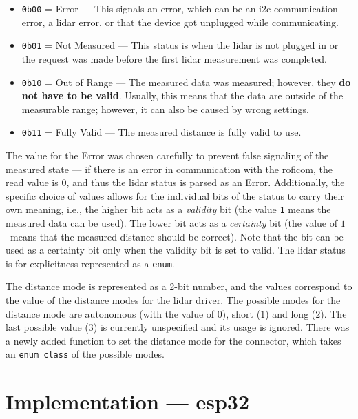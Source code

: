 \documentclass[
  digital,     %
  oneside,     %
  nosansbold,  %
  nocolorbold, %
  nolof,         %
  nolot,         %
]{fithesis4}
\newcommand{\TODO}[1]{#1} %
\newcommand{\TODOLIST}[1]{}
\begin{document}
\begin{itemize}
    \item \lstinline|0b00| = Error --- This signals an error, which can be an \acrshort{i2c}
        communication error, a \acrshort{lidar} error, or that the device got unplugged while
        communicating.  
    \item \lstinline|0b01| = Not Measured --- This status is when the \acrshort{lidar} is not
        plugged in or the request was made before the first \acrshort{lidar} measurement was
        completed.
    \item \lstinline|0b10| = Out of Range --- The measured data was measured; however, they
        \textbf{do not have to be valid}. Usually, this means that the data are outside of the
        measurable range; however, it can also be caused by wrong settings.
    \item \lstinline|0b11| = Fully Valid --- The measured distance is fully valid to use.
\end{itemize}

The value for the Error was chosen carefully to prevent false signaling of the measured state --- if
there is an error in communication with the \acrshort{roficom}, the read value is $0$, and thus the
\acrshort{lidar} status is parsed as an Error. Additionally, the specific choice of values allows
for the individual bits of the status to carry their own meaning, i.e., the higher bit acts as a
\emph{validity} bit (the value \verb|1| means the measured data can be used). The lower bit acts as
a \emph{certainty} bit (the value of $1$~means that the measured distance should be correct). Note
that the bit can be used as a certainty bit only when the validity bit is set to valid. The
\acrshort{lidar} status is for explicitness represented as a \lstinline|enum|.

The distance mode is represented as a 2-bit number, and the values correspond to the value of the
distance modes for the \acrshort{lidar} driver. The possible modes for the distance mode are
autonomous (with the value of $0$), short ($1$) and long ($2$). The last possible value ($3$) is
currently unspecified and its usage is ignored. There was a newly added function to set the distance
mode for the connector, which takes an \lstinline|enum class| of the possible modes.

\section{ Implementation --- esp32 }
\TODOLIST{
\begin{itemize}
    \item Apply changes from interface --- lidar status, distance and distance modes
    \item Issue $\rightarrow$ status is not being updated $\rightarrow$ Needed to implement poller
\end{itemize}
}
\end{document}
